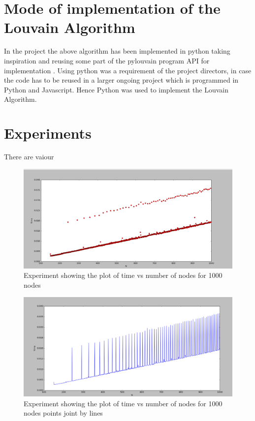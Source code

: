 \section{Mode of implementation of the Louvain Algorithm}
In the project the above algorithm has been implemented in python taking inspiration and reusing some part of the pylouvain program API for implementation \cite{pylouvain}. Using python was a requirement of the project directors, in case the code has to be reused in a larger ongoing project which is programmed in Python and Javascript. Hence Python was used to implement the Louvain Algorithm.

\section{Experiments}
There are vaiour 
\cite{githubtest1} \cite{snap} \cite{igraph}
\\
\begin{figure}[H]
\centering
\includegraphics[scale=0.3]{e1000.png}
\caption{Experiment showing the plot of time vs number of nodes for 1000 nodes}
\end{figure}

\begin{figure}[H]
\centering
\includegraphics[scale=0.3]{e1000b.png}
\caption{Experiment showing the plot of time vs number of nodes for 1000 nodes points joint by lines}
\end{figure}

